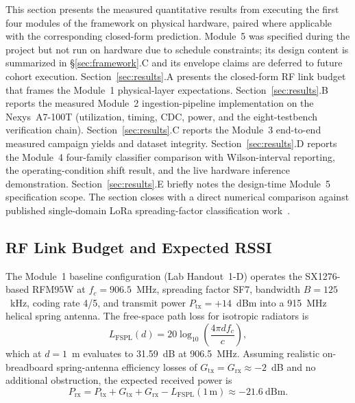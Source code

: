 \documentclass[conference]{IEEEtran}
\begin{document}
This section presents the measured quantitative results from executing the first four modules of the framework on physical hardware, paired where applicable with the corresponding closed-form prediction. Module~5 was specified during the project but not run on hardware due to schedule constraints; its design content is summarized in \S\ref{sec:framework}.C and its envelope claims are deferred to future cohort execution. Section~\ref{sec:results}.A presents the closed-form RF link budget that frames the Module~1 physical-layer expectations. Section~\ref{sec:results}.B reports the measured Module~2 ingestion-pipeline implementation on the Nexys~A7-100T (utilization, timing, CDC, power, and the eight-testbench verification chain). Section~\ref{sec:results}.C reports the Module~3 end-to-end measured campaign yields and dataset integrity. Section~\ref{sec:results}.D reports the Module~4 four-family classifier comparison with Wilson-interval reporting, the operating-condition shift result, and the live hardware inference demonstration. Section~\ref{sec:results}.E briefly notes the design-time Module~5 specification scope. The section closes with a direct numerical comparison against published single-domain LoRa spreading-factor classification work~\cite{b5}.

\subsection{RF Link Budget and Expected RSSI}

The Module~1 baseline configuration (Lab Handout~1-D) operates the SX1276-based RFM95W at $f_c=906.5$~MHz, spreading factor SF7, bandwidth $B=125$~kHz, coding rate 4/5, and transmit power $P_{\mathrm{tx}}=+14$~dBm into a 915~MHz helical spring antenna. The free-space path loss for isotropic radiators is
\begin{equation}
L_{\mathrm{FSPL}}(d)=20\log_{10}\!\left(\frac{4\pi d f_c}{c}\right),
\label{eq:fspl}
\end{equation}
which at $d=1$~m evaluates to 31.59~dB at 906.5~MHz. Assuming realistic on-breadboard spring-antenna efficiency losses of $G_{\mathrm{tx}}=G_{\mathrm{rx}}\approx -2$~dB and no additional obstruction, the expected received power is
\begin{equation}
P_{\mathrm{rx}} = P_{\mathrm{tx}} + G_{\mathrm{tx}} + G_{\mathrm{rx}} - L_{\mathrm{FSPL}}(1\,\mathrm{m}) \approx -21.6~\mathrm{dBm}.
\end{equation}
\end{document}
